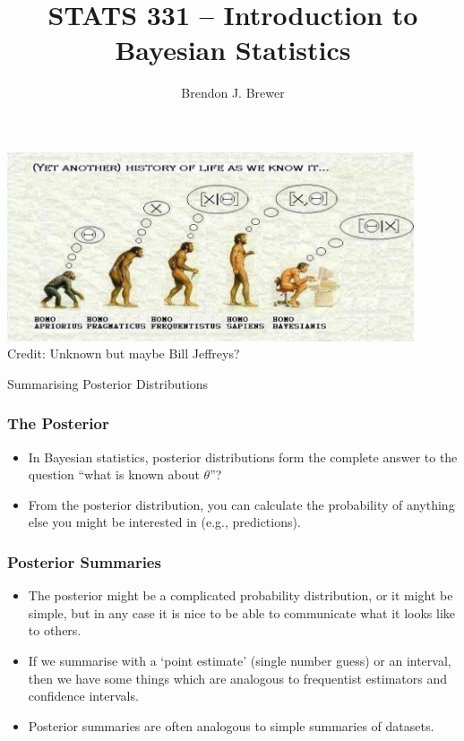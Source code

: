 \documentclass{beamer}
\author{Brendon J. Brewer}
\title{STATS 331 -- Introduction to Bayesian Statistics}
\institute{The University of Auckland}
\date{}
\begin{document}
\frame{\titlepage}

\begin{frame}
\begin{center}
\includegraphics[width=0.9\textwidth]{images/history.png} \\
Credit: Unknown but maybe Bill Jeffreys?
\end{center}

\end{frame}


\begin{frame}

\begin{center}
Summarising Posterior Distributions
\end{center}

\end{frame}

\begin{frame}
\frametitle{The Posterior}
\begin{itemize}
\item In Bayesian statistics, posterior distributions form the complete answer
to the question ``what is known about $\theta$''? \pause
\item From the posterior distribution, you can calculate the probability of
anything else you might be interested in (e.g., predictions).
\end{itemize}

\end{frame}

\begin{frame}
\frametitle{Posterior Summaries}

\begin{itemize}
\item The posterior might be a complicated probability distribution, or it
might be simple, but in any case it is nice to be able to communicate what it
looks like to others. \pause
\item If we summarise with a `point estimate' (single number guess) or
an interval, then we have some things which are analogous to frequentist
estimators and confidence intervals.\pause
\item Posterior summaries are often analogous to simple summaries of datasets.
\end{itemize}

\end{frame}
\end{document}
